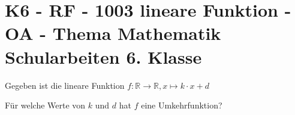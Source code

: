 \section{K6 - RF - 1003 lineare Funktion - OA - Thema Mathematik Schularbeiten 6. Klasse}

\begin{beispiel}[K6 - RF]{1} %
			Gegeben ist die lineare Funktion $f\!:\mathbb{R}\rightarrow\mathbb{R}, x\mapsto k\cdot x+d$
			
			Für welche Werte von $k$ und $d$ hat $f$ eine Umkehrfunktion?\leer
			
							\end{beispiel}